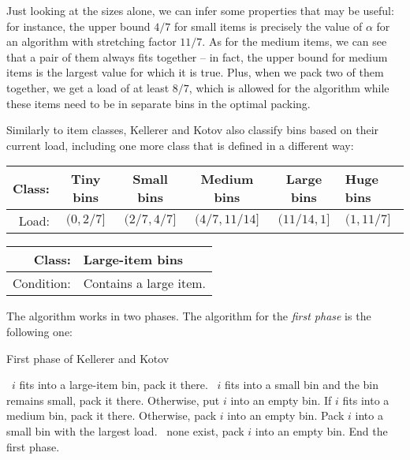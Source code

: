 Just looking at the sizes alone, we can infer some properties that may
be useful: for instance, the upper bound $4/7$ for small items is
precisely the value of $\alpha$ for an algorithm with stretching
factor $11/7$. As for the medium items, we can see that a pair of them
always fits together -- in fact, the upper bound for medium items is
the largest value for which it is true. Plus, when we pack two of them
together, we get a load of at least $8/7$, which is allowed for the
algorithm while these items need to be in separate bins in the optimal
packing.


Similarly to item classes, Kellerer and Kotov also classify bins based
on their current load, including one more class that is defined in a
different way:

\begin{center}
  \begin{tabular}{ r | c | c | c | c | l }
    Class: & Tiny bins & Small bins & Medium bins & Large bins & Huge bins \\ \hline
    Load:  & $(0,2/7]$ & $(2/7, 4/7]$ & $(4/7, 11/14]$ & $(11/14,1]$ & $(1,11/7]$ \\ 
  \end{tabular}
\end{center}

\begin{center}
  \begin{tabular}{ r | l }
    Class: & Large-item bins \\ \hline
    Condition: & Contains a large item. \\ 
  \end{tabular}
\end{center}


The algorithm works in two phases. The algorithm for the \emph{first
phase} is the following one:

\begin{algorithm}
\caption{First phase of Kellerer and Kotov}
\begin{algorithmic}[1]
\State \algorithmicif\ $i$ fits into a large-item bin, pack it there.
\State \algorithmicif\ $i$ fits into a small bin and the bin remains small, pack it there.
\State Otherwise, put $i$ into an empty bin.
\EndIf
{}
\State If $i$ fits into a medium bin, pack it there.
\State Otherwise, pack $i$ into an empty bin.
\EndIf
{}
\State Pack $i$ into a small bin with the largest load.
\State \algorithmicif\ none exist, pack $i$ into an empty bin.
\EndIf
{}
\State End the first phase.
\EndIf
\EndFor 
\end{algorithmic}
\end{algorithm}

